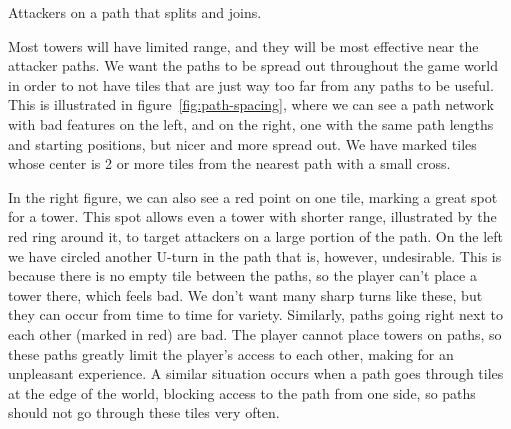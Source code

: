 \begin{center}
    \captionsetup{type=figure}
    \caption{Attackers on a path that splits and joins.}
    \label{fig:attackers-path-split}
\end{center}

Most towers will have limited range, and they will be most effective near the attacker paths.
We want the paths to be spread out throughout the game world in order to not have tiles that are just way too far from any paths to be useful.
This is illustrated in figure~\ref{fig:path-spacing}, where we can see a path network with bad features on the left, and on the right, one with the same path lengths and starting positions, but nicer and more spread out.
We have marked tiles whose center is 2 or more tiles from the nearest path with a small cross.

In the right figure, we can also see a red point on one tile, marking a great spot for a tower.
This spot allows even a tower with shorter range, illustrated by the red ring around it, to target attackers on a large portion of the path.
On the left we have circled another U-turn in the path that is, however, undesirable.
This is because there is no empty tile between the paths, so the player can't place a tower there, which feels bad.
We don't want many sharp turns like these, but they can occur from time to time for variety.
Similarly, paths going right next to each other (marked in red) are bad.
The player cannot place towers on paths, so these paths greatly limit the player's access to each other, making for an unpleasant experience.
A similar situation occurs when a path goes through tiles at the edge of the world, blocking access to the path from one side, so paths should not go through these tiles very often.

